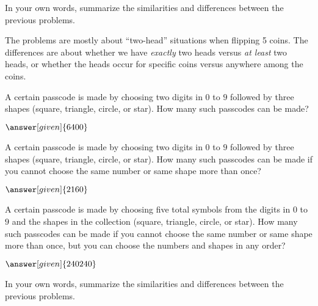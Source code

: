 \documentclass[nooutcomes]{ximera}
\begin{document}
\begin{problem}
In your own words, summarize the similarities and differences between the previous problems.

\begin{freeResponse}
\begin{hint}
The problems are mostly about ``two-head'' situations when flipping 5 coins.  The differences are about whether we have \emph{exactly} two heads versus \emph{at least} two heads, or whether the heads occur for specific coins versus anywhere among the coins.  
\end{hint}
\end{freeResponse}
\end{problem}


\begin{problem}
A certain passcode is made by choosing two digits in $0$ to $9$ followed by three shapes (square, triangle, circle, or star).  How many such passcodes can be made?
\begin{prompt}
	$\answer[given]{6400}$ %
\end{prompt}
\end{problem}



\begin{problem}
A certain passcode is made by choosing two digits in $0$ to $9$ followed by three shapes (square, triangle, circle, or star).  How many such passcodes can be made if you cannot choose the same number or same shape more than once?
\begin{prompt}
	$\answer[given]{2160}$ %
\end{prompt}
\end{problem}



\begin{problem}
A certain passcode is made by choosing five total symbols from the digits in $0$ to $9$ and the shapes in the collection (square, triangle, circle, or star).  How many such passcodes can be made if you cannot choose the same number or same shape more than once, but you can choose the numbers and shapes in any order?
\begin{prompt}
	$\answer[given]{240240}$ %
\end{prompt}
\end{problem}


\begin{problem}
In your own words, summarize the similarities and differences between the previous problems.

\begin{freeResponse}
\end{freeResponse}
\end{problem}
\end{document}
